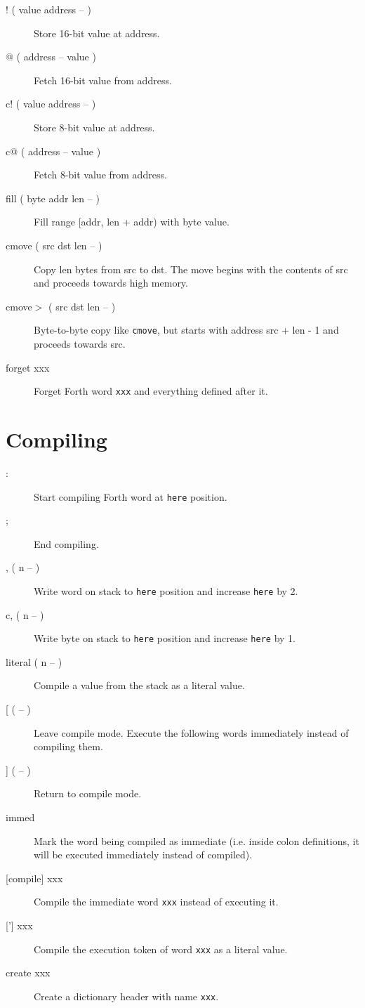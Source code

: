 \begin{description}
\item[! ( value address -- )] Store 16-bit value at address.  
\item[@ ( address -- value )] Fetch 16-bit value from address.  
\item[c! ( value address -- )] Store 8-bit value at address.  
\item[c@ ( address -- value )] Fetch 8-bit value from address.
\item[fill ( byte addr len -- )] Fill range [addr, len + addr) with byte value.
\item[cmove ( src dst len -- )]
Copy len bytes from src to dst. The move begins with the contents of src and proceeds towards high memory.
\item[cmove$>$ ( src dst len -- )]
Byte-to-byte copy like \texttt{cmove}, but starts with address src + len - 1 and proceeds towards src.
\item[forget xxx] Forget Forth word \texttt{xxx} and everything defined after it.

\end{description}
\section{Compiling}

\begin{description}
\item[:] Start compiling Forth word at \texttt{here} position.
\item[;] End compiling.
\item[, ( n -- )] Write word on stack to \texttt{here} position and increase \texttt{here} by 2.
\item[c, ( n -- )] Write byte on stack to \texttt{here} position and increase \texttt{here} by 1.
\item[literal ( n -- )] Compile a value from the stack as a literal value.
\item[[ ( -- )] Leave compile mode. Execute the following words immediately instead of compiling them.
\item[{]} ( -- )] Return to compile mode.
\item[immed] Mark the word being compiled as immediate (i.e. inside colon definitions, it will be executed immediately instead of compiled).
\item[[compile{]} xxx] Compile the immediate word \texttt{xxx} instead of executing it.
\item[{[']} xxx] Compile the execution token of word \texttt{xxx} as a literal value.
\item[create xxx] Create a dictionary header with name \texttt{xxx}. 
\end{description}

